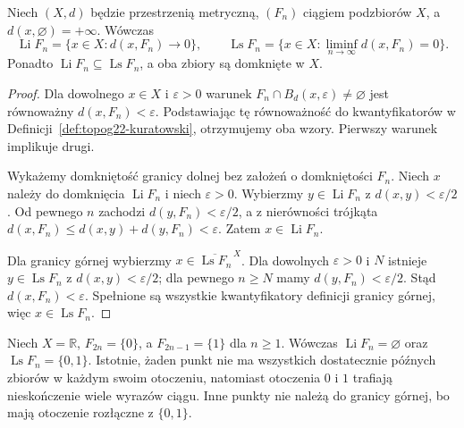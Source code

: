 \begin{stwierdzenie}
\label{prop:topog22-kuratowski-dist}
Niech \((X,d)\) będzie przestrzenią metryczną,
\((F_n)\) ciągiem podzbiorów \(X\), a
\(d(x,\varnothing)=+\infty\).
Wówczas
\[
 \operatorname{Li}F_n
 =\{x\in X:d(x,F_n)\longrightarrow0\},
 \qquad
 \operatorname{Ls}F_n
 =\{x\in X:\liminf_{n\to\infty}d(x,F_n)=0\}.
\]
Ponadto \(\operatorname{Li}F_n\subseteq\operatorname{Ls}F_n\),
a oba zbiory są domknięte w \(X\).
\end{stwierdzenie}
\begin{proof}
Dla dowolnego \(x\in X\) i \(\varepsilon>0\)
warunek \(F_n\cap B_d(x,\varepsilon)\neq\varnothing\)
jest równoważny \(d(x,F_n)<\varepsilon\).
Podstawiając tę równoważność do kwantyfikatorów
w Definicji~\ref{def:topog22-kuratowski}, otrzymujemy
oba wzory. Pierwszy warunek implikuje drugi.

Wykażemy domkniętość granicy dolnej bez założeń
o domkniętości \(F_n\).
Niech \(x\) należy do domknięcia \(\operatorname{Li}F_n\)
i niech \(\varepsilon>0\).
Wybierzmy \(y\in\operatorname{Li}F_n\)
z \(d(x,y)<\varepsilon/2\).
Od pewnego \(n\) zachodzi \(d(y,F_n)<\varepsilon/2\),
a z nierówności trójkąta
\(d(x,F_n)\le d(x,y)+d(y,F_n)<\varepsilon\).
Zatem \(x\in\operatorname{Li}F_n\).

Dla granicy górnej wybierzmy
\(x\in\overline{\operatorname{Ls}F_n}^{\,X}\).
Dla dowolnych \(\varepsilon>0\) i \(N\)
istnieje \(y\in\operatorname{Ls}F_n\)
z \(d(x,y)<\varepsilon/2\);
dla pewnego \(n\ge N\) mamy
\(d(y,F_n)<\varepsilon/2\).
Stąd \(d(x,F_n)<\varepsilon\).
Spełnione są wszystkie kwantyfikatory
definicji granicy górnej, więc
\(x\in\operatorname{Ls}F_n\).
\end{proof}

\begin{przyklad}
\label{ex:topog22-oscillating}
Niech \(X=\mathbb R\), \(F_{2n}=\{0\}\),
a \(F_{2n-1}=\{1\}\) dla \(n\ge1\).
Wówczas
\(\operatorname{Li}F_n=\varnothing\) oraz
\(\operatorname{Ls}F_n=\{0,1\}\).
Istotnie, żaden punkt nie ma wszystkich dostatecznie
późnych zbiorów w każdym swoim otoczeniu,
natomiast otoczenia \(0\) i \(1\) trafiają
nieskończenie wiele wyrazów ciągu.
Inne punkty nie należą do granicy górnej,
bo mają otoczenie rozłączne z \(\{0,1\}\).
\end{przyklad}

